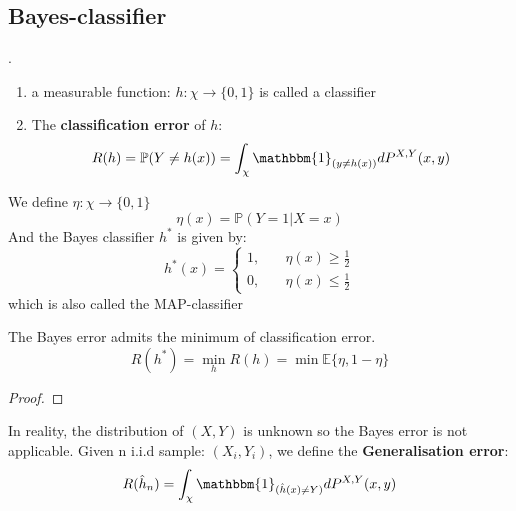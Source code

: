 \subsection{Bayes-classifier}

\begin{definition}[Classifier].
\begin{enumerate}
	\item a measurable function: $h:\chi \rightarrow \{0, 1 \}$ is called a classifier
	\item The \textbf{classification error} of $h$:
		\begin{equation*}
			R(h) = \mathbb{P}(Y \neq h(x)) = \int_\chi \mathbbm{1}_{(y \neq h(x))} dP^{X, Y}(x, y)
		\end{equation*}
\end{enumerate}
\end{definition}

\begin{definition}
We define $\eta: \chi \rightarrow \{0, 1\}$
\begin{equation*}
	\eta(x) = \mathbb{P} (Y = 1| X = x)
\end{equation*}
And the Bayes classifier $h^*$ is given by:
\begin{equation*}
	h^*(x) = 
		 \left\{\begin{aligned}
		 		1, \quad & \eta(x) \geq \frac{1}{2}\\
		 		0, \quad & \eta(x) \leq \frac{1}{2}
		 		\end{aligned}\right.
\end{equation*}
which is also called the MAP-classifier
\end{definition}

\begin{theorem} \label{technique: conditioning}
The Bayes error admits the minimum of classification error.
\begin{equation*}
	R(h^*) = \min_h R(h) = \min \mathbb{E} \{ \eta, 1 - \eta \}	
\end{equation*}
\end{theorem}

\begin{proof}
	
\end{proof}


In reality, the distribution of $(X,Y)$ is unknown so the Bayes error is not applicable. Given n i.i.d sample: $(X_i, Y_i)$, we define the \textbf{Generalisation error}:
\begin{equation*}
	R(\hat{h}_n) = \int_\chi \mathbbm{1}_{(\hat{h}(x) \neq Y)} dP^{X, Y}(x, y)
\end{equation*}



